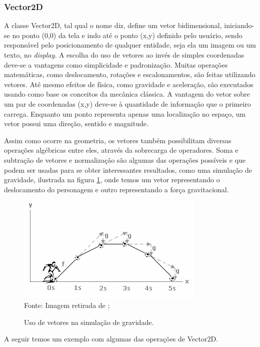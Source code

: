 \subsubsection{Vector2D}
%
%
A classe Vector2D, tal qual o nome diz, define um vetor bidimensional, iniciando-se no ponto (0,0) da tela e indo até o ponto (x,y) definido pelo usuário, sendo responsável pelo posicionamento de qualquer entidade, seja ela um imagem ou um texto, no \textit{display}. A escolha do uso de vetores ao invés de simples coordenadas deve-se a vantagens como simplicidade e padronização. Muitas operações matemáticas, como deslocamento, rotações e escalonamentos, são feitas utilizando vetores. Até mesmo efeitos de física, como gravidade e aceleração, são executados usando como base os conceitos da mecânica clássica. A vantagem do vetor sobre um par de coordenadas (x,y) deve-se à quantidade de informação que o primeiro carrega. Enquanto um ponto representa apenas uma localização no espaço, um vetor possui uma direção, sentido e magnitude. 
\par 
Assim como ocorre na geometria, os vetores também possibilitam diversas operações algébricas entre eles, através da sobrecarga de operadores. Soma e subtração de vetores e normalização são algumas das operações possíveis e que podem ser usadas para se obter interessantes resultados, como uma simulação de gravidade, ilustrada na figura \ref{VetorGravidade}, onde temos um vetor representando o deslocamento do personagem e outro representando a força gravitacional.
%
%
%
\begin{figure}[H]
    \centering
    \caption{Uso de vetores na simulação de gravidade.}
    \label{VetorGravidade}
    \includegraphics[scale = 0.8]{Imagens/VetorGravidade.png}
    \\Fonte: Imagem retirada de \cite{PontoV};
\end{figure}
%
%
A seguir temos um exemplo com algumas das operações de Vector2D.
%

%
%
